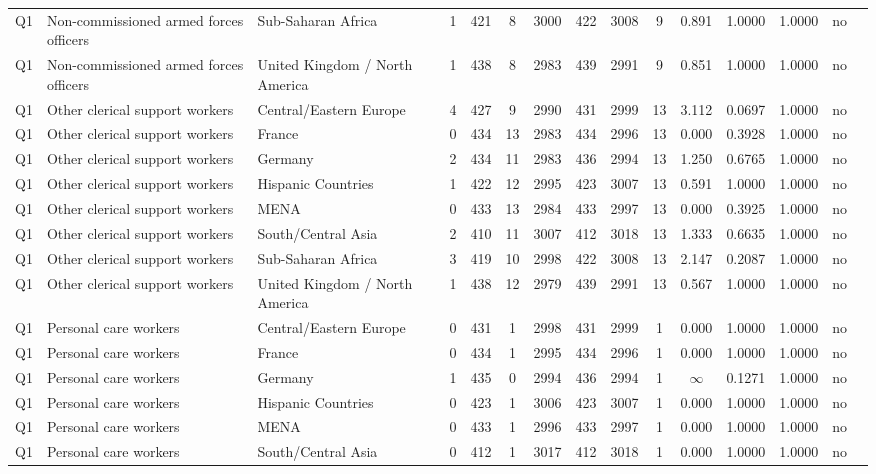\begin{longtable}{lllrcccccccccll}
Q1 & Non-commissioned armed forces officers & Sub-Saharan Africa & 1 & 421 & 8 & 3000 & 422 & 3008 & 9 & 0.891 & 1.0000 & 1.0000 & no \\
Q1 & Non-commissioned armed forces officers & United Kingdom / North America & 1 & 438 & 8 & 2983 & 439 & 2991 & 9 & 0.851 & 1.0000 & 1.0000 & no \\
Q1 & Other clerical support workers & Central/Eastern Europe & 4 & 427 & 9 & 2990 & 431 & 2999 & 13 & 3.112 & 0.0697 & 1.0000 & no \\
Q1 & Other clerical support workers & France & 0 & 434 & 13 & 2983 & 434 & 2996 & 13 & 0.000 & 0.3928 & 1.0000 & no \\
Q1 & Other clerical support workers & Germany & 2 & 434 & 11 & 2983 & 436 & 2994 & 13 & 1.250 & 0.6765 & 1.0000 & no \\
Q1 & Other clerical support workers & Hispanic Countries & 1 & 422 & 12 & 2995 & 423 & 3007 & 13 & 0.591 & 1.0000 & 1.0000 & no \\
Q1 & Other clerical support workers & MENA & 0 & 433 & 13 & 2984 & 433 & 2997 & 13 & 0.000 & 0.3925 & 1.0000 & no \\
Q1 & Other clerical support workers & South/Central Asia & 2 & 410 & 11 & 3007 & 412 & 3018 & 13 & 1.333 & 0.6635 & 1.0000 & no \\
Q1 & Other clerical support workers & Sub-Saharan Africa & 3 & 419 & 10 & 2998 & 422 & 3008 & 13 & 2.147 & 0.2087 & 1.0000 & no \\
Q1 & Other clerical support workers & United Kingdom / North America & 1 & 438 & 12 & 2979 & 439 & 2991 & 13 & 0.567 & 1.0000 & 1.0000 & no \\
Q1 & Personal care workers & Central/Eastern Europe & 0 & 431 & 1 & 2998 & 431 & 2999 & 1 & 0.000 & 1.0000 & 1.0000 & no \\
Q1 & Personal care workers & France & 0 & 434 & 1 & 2995 & 434 & 2996 & 1 & 0.000 & 1.0000 & 1.0000 & no \\
Q1 & Personal care workers & Germany & 1 & 435 & 0 & 2994 & 436 & 2994 & 1 & $\infty$ & 0.1271 & 1.0000 & no \\
Q1 & Personal care workers & Hispanic Countries & 0 & 423 & 1 & 3006 & 423 & 3007 & 1 & 0.000 & 1.0000 & 1.0000 & no \\
Q1 & Personal care workers & MENA & 0 & 433 & 1 & 2996 & 433 & 2997 & 1 & 0.000 & 1.0000 & 1.0000 & no \\
Q1 & Personal care workers & South/Central Asia & 0 & 412 & 1 & 3017 & 412 & 3018 & 1 & 0.000 & 1.0000 & 1.0000 & no \\

\end{longtable}
